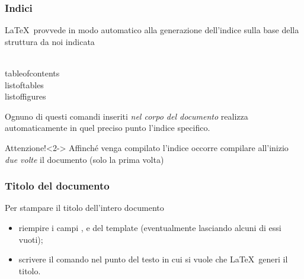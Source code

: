 \documentclass[svgnames,%
	ucs,%
	pdftex]{guitbeamer}
\begin{document}
\begin{frame}
  \frametitle{Indici}
	\LaTeX\ provvede in modo automatico alla generazione dell'indice sulla base della struttura da noi indicata
	\begin{LaTeXcode}
		\\tableofcontents\n
		\\listoftables\n
		\\listoffigures 
	\end{LaTeXcode}
	Ognuno di questi comandi inseriti \emph{nel corpo del documento}
	realizza automaticamente in quel preciso punto l'indice specifico.
  \medskip
	\begin{block}{Attenzione!}<2->
		Affinch\'e venga compilato l'indice occorre compilare all'inizio \emph{due
		volte} il documento (solo la prima volta)
	\end{block}
\end{frame}
\begin{frame}
  \frametitle{Titolo del documento}
	Per stampare il titolo dell'intero documento
	\begin{itemize}
		\item riempire i campi ,  e  del template (eventualmente lasciando alcuni di essi vuoti);
		\item scrivere il comando  nel punto del testo in cui si vuole che \LaTeX\ generi il titolo.
	\end{itemize}
\end{frame}
\end{document}

